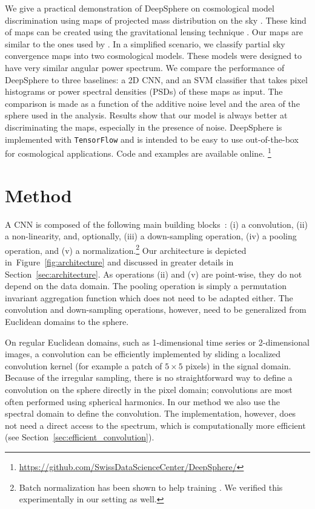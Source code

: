 \documentclass[final,twocolumn,3p,times,sort&compress]{elsarticle}
\newcommand{\figref}[1]{Figure~\ref{fig:#1}}
\newcommand{\secref}[1]{Section~\ref{sec:#1}}
\newcommand{\1}{\b{1}}              %
\newcommand{\0}{\b{0}}              %
\newcommand{\pkg}[1]{\texttt{#1}}
\begin{document}
We give a practical demonstration of DeepSphere on cosmological model discrimination using maps of projected mass distribution on the sky \citep{chang2017curvedsky}.
These kind of maps can be created using the gravitational lensing technique \citep[see][for review]{BartelmannSchneider2001weak}.
Our maps are similar to the ones used by \citep{schmelze2017cosmologicalmodel}.
In a simplified scenario, we classify partial sky convergence maps into two cosmological models.
These models were designed to have very similar angular power spectrum.
We compare the performance of DeepSphere to three baselines: a 2D CNN, and an SVM classifier that takes pixel histograms or power spectral densities (PSDs) of these maps as input.
The comparison is made as a function of the additive noise level and the area of the sphere used in the analysis.
Results show that our model is always better at discriminating the maps, especially in the presence of noise.
DeepSphere is implemented with \pkg{TensorFlow} \citep{abadi2016tensorflow} and is intended to be easy to use out-of-the-box for cosmological applications.
Code and examples are available online.{ \footnote{\url{https://github.com/SwissDataScienceCenter/DeepSphere/}}}


\section{Method}
\label{sec:method}

A CNN is composed of the following main building blocks~\citep{lecun1998cnn}:
(i) a convolution,
(ii) a non-linearity, and, optionally,
(iii) a down-sampling operation,
(iv) a pooling operation, and
(v) a normalization.\footnote{Batch normalization has been shown to help training \citep{ioffe2015batchnorm}. We verified this experimentally in our setting as well.}
Our architecture is depicted in~\figref{architecture} and discussed in greater details in \secref{architecture}. As operations (ii) and (v) are point-wise, they do not depend on the data domain. The pooling operation is simply a permutation invariant aggregation function which does not need to be adapted either. The convolution and down-sampling operations, however, need to be generalized from Euclidean domains to the sphere.

On regular Euclidean domains, such as 1-dimensional time series or 2-dimensional images, a convolution can be efficiently implemented by sliding a localized convolution kernel (for example a patch of $5 \times 5$ pixels) in the signal domain.
Because of the irregular sampling, there is no straightforward way to define a convolution on the sphere directly in the pixel domain; convolutions are most often performed using spherical harmonics.
In our method we also use the spectral domain to define the convolution.
The implementation, however, does not need a direct access to the spectrum, which is computationally more efficient (see \secref{efficient_convolution}).
\end{document}
